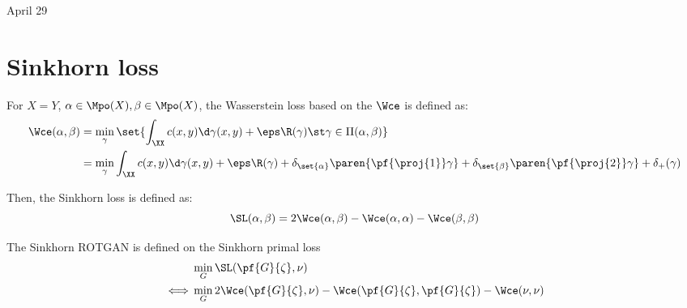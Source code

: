 \documentclass[11pt,a4paper]{article}
\begin{document}

{\Huge April 29}

\section*{Sinkhorn loss}

For $X=Y$, $\alpha \in \Mpo(X), \beta \in \Mpo(X)$, the Wasserstein loss based on the $\Wce$ is defined as:
\begin{align}
    \label{eqn:wasserstein-loss}
    \Wce(\alpha, \beta) &= \min_{\gamma} \set{ \int_{\XX} c(x, y) \d \gamma(x, y) + \eps \R(\gamma) \st \gamma \in \Pi(\alpha, \beta)} \\
                        &= \min_{\gamma} \int_{\XX} c(x, y) \d \gamma(x, y) + \eps \R(\gamma) + \delta_{\set{\alpha}}\paren{ \pf{\proj{1}}\gamma } + \delta_{\set{\beta}}\paren{\pf{\proj{2}}\gamma} + \delta_{+}(\gamma)
\end{align}

Then, the Sinkhorn loss is defined as:
\begin{equation}
    \SL(\alpha, \beta) = 2 \Wce(\alpha, \beta) - \Wce(\alpha, \alpha) - \Wce(\beta, \beta)
\end{equation}

The Sinkhorn ROTGAN is defined on the Sinkhorn primal loss
\begin{align}
    &\min_{G} \SL(\pf{G}{\zeta}, \nu)  \\
    \iff & \min_{G} 2 \Wce(\pf{G}{\zeta}, \nu) - \Wce(\pf{G}{\zeta}, \pf{G}{\zeta}) - \Wce(\nu, \nu)
\end{align}
\end{document}
